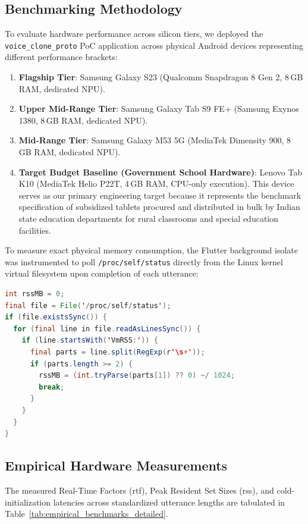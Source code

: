 \subsection{Benchmarking Methodology}
To evaluate hardware performance across silicon tiers, we deployed the \texttt{voice\_clone\_proto} PoC application across physical Android devices representing different performance brackets:
\begin{enumerate}
    \item \textbf{Flagship Tier}: Samsung Galaxy S23 (Qualcomm Snapdragon 8 Gen 2, 8\,GB RAM, dedicated NPU).
    \item \textbf{Upper Mid-Range Tier}: Samsung Galaxy Tab S9 FE+ (Samsung Exynos 1380, 8\,GB RAM, dedicated NPU).
    \item \textbf{Mid-Range Tier}: Samsung Galaxy M53 5G (MediaTek Dimensity 900, 8\,GB RAM, dedicated NPU).
    \item \textbf{Target Budget Baseline (Government School Hardware)}: Lenovo Tab K10 (MediaTek Helio P22T, 4\,GB RAM, CPU-only execution). This device serves as our primary engineering target because it represents the benchmark specification of subsidized tablets procured and distributed in bulk by Indian state education departments for rural classrooms and special education facilities.
\end{enumerate}

To measure exact physical memory consumption, the Flutter background isolate was instrumented to poll \texttt{/proc/self/status} directly from the Linux kernel virtual filesystem upon completion of each utterance:
\begin{lstlisting}[language=Java,caption={Dart In-Kernel Memory Profiling Hook via /proc/self/status}]
int rssMB = 0;
final file = File('/proc/self/status');
if (file.existsSync()) {
  for (final line in file.readAsLinesSync()) {
    if (line.startsWith('VmRSS:')) {
      final parts = line.split(RegExp(r'\s+'));
      if (parts.length >= 2) {
        rssMB = (int.tryParse(parts[1]) ?? 0) ~/ 1024;
        break;
      }
    }
  }
}
\end{lstlisting}

\subsection{Empirical Hardware Measurements}
The measured Real-Time Factors (\gls{rtf}), Peak Resident Set Sizes (\gls{rss}), and cold-initialization latencies across standardized utterance lengths are tabulated in Table~\ref{tab:empirical_benchmarks_detailed}.

